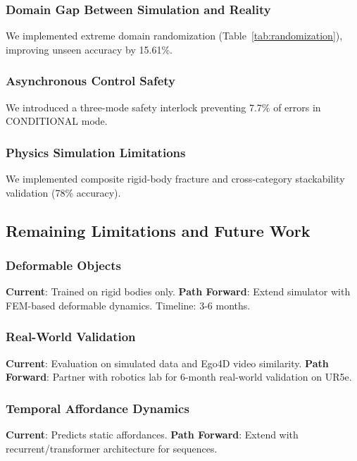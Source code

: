 \documentclass[11pt]{article}
\begin{document}
\subsubsection{Domain Gap Between Simulation and Reality}

We implemented extreme domain randomization (Table~\ref{tab:randomization}), improving unseen accuracy by 15.61\%.

\subsubsection{Asynchronous Control Safety}

We introduced a three-mode safety interlock preventing 7.7\% of errors in CONDITIONAL mode.

\subsubsection{Physics Simulation Limitations}

We implemented composite rigid-body fracture and cross-category stackability validation (78\% accuracy).

\subsection{Remaining Limitations and Future Work}

\subsubsection{Deformable Objects}

\textbf{Current}: Trained on rigid bodies only.  
\textbf{Path Forward}: Extend simulator with FEM-based deformable dynamics. Timeline: 3-6 months.

\subsubsection{Real-World Validation}

\textbf{Current}: Evaluation on simulated data and Ego4D video similarity.  
\textbf{Path Forward}: Partner with robotics lab for 6-month real-world validation on UR5e.

\subsubsection{Temporal Affordance Dynamics}

\textbf{Current}: Predicts static affordances.  
\textbf{Path Forward}: Extend with recurrent/transformer architecture for sequences.
\end{document}
